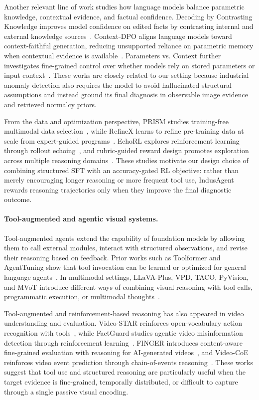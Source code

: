 \documentclass{llmxive}
\begin{document}
{Another relevant line of work studies how language models balance parametric knowledge, contextual evidence, and factual confidence. Decoding by Contrasting Knowledge improves model confidence on edited facts by contrasting internal and external knowledge sources~\citep{bi2024decoding}. Context-DPO aligns language models toward context-faithful generation, reducing unsupported reliance on parametric memory when contextual evidence is available~\citep{bi2024context}. Parameters vs. Context further investigates fine-grained control over whether models rely on stored parameters or input context~\citep{bi2025parameters}. These works are closely related to our setting because industrial anomaly detection also requires the model to avoid hallucinated structural assumptions and instead ground its final diagnosis in observable image evidence and retrieved normalcy priors.

From the data and optimization perspective, PRISM studies training-free multimodal data selection~\citep{Bi2025PRISMSI}, while RefineX learns to refine pre-training data at scale from expert-guided programs~\citep{bi2025refinex}. EchoRL explores reinforcement learning through rollout echoing~\citep{bi2026echorl}, and rubric-guided reward design promotes exploration across multiple reasoning domains~\citep{bi2025reward}. These studies motivate our design choice of combining structured SFT with an accuracy-gated RL objective: rather than merely encouraging longer reasoning or more frequent tool use, IndusAgent rewards reasoning trajectories only when they improve the final diagnostic outcome.

\paragraph{Tool-augmented and agentic visual systems.}
Tool-augmented agents extend the capability of foundation models by allowing them to call external modules, interact with structured observations, and revise their reasoning based on feedback. Prior works such as Toolformer and AgentTuning show that tool invocation can be learned or optimized for general language agents~\citep{schick2024toolformer, zeng2024agenttuning}. In multimodal settings, LLaVA-Plus, VPD, TACO, PyVision, and MVoT introduce different ways of combining visual reasoning with tool calls, programmatic execution, or multimodal thoughts~\citep{liu2023llavapluslearningusetools, hu2024visual, ma2024taco, zhao2025pyvision, li2025MVoT}. 

Tool-augmented and reinforcement-based reasoning has also appeared in video understanding and evaluation. Video-STAR reinforces open-vocabulary action recognition with tools~\citep{yuan2025video}, while FactGuard studies agentic video misinformation detection through reinforcement learning~\citep{li2026factguard}. FINGER introduces content-aware fine-grained evaluation with reasoning for AI-generated videos~\citep{chen2025finger}, and Video-CoE reinforces video event prediction through chain-of-events reasoning~\citep{su2026video}. These works suggest that tool use and structured reasoning are particularly useful when the target evidence is fine-grained, temporally distributed, or difficult to capture through a single passive visual encoding.

}
\end{document}
